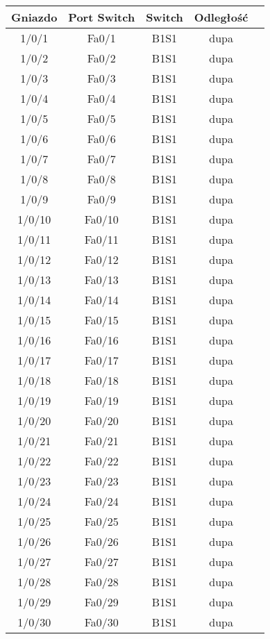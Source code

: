 \begin{center}
    \begin{longtable}{|c|c|c|c|c|}
    \hline
    Gniazdo & Port Switch & Switch & Odległość \\ \hline
	1/0/1 & Fa0/1 & B1S1 & dupa \\ \hline
	1/0/2 & Fa0/2 & B1S1 & dupa \\ \hline
	1/0/3 & Fa0/3 & B1S1 & dupa \\ \hline
	1/0/4 & Fa0/4 & B1S1 & dupa \\ \hline
	1/0/5 & Fa0/5 & B1S1 & dupa \\ \hline
	1/0/6 & Fa0/6 & B1S1 & dupa \\ \hline
	1/0/7 & Fa0/7 & B1S1 & dupa \\ \hline
	1/0/8 & Fa0/8 & B1S1 & dupa \\ \hline
	1/0/9 & Fa0/9 & B1S1 & dupa \\ \hline
	1/0/10 & Fa0/10 & B1S1 & dupa \\ \hline
	1/0/11 & Fa0/11 & B1S1 & dupa \\ \hline
	1/0/12 & Fa0/12 & B1S1 & dupa \\ \hline
	1/0/13 & Fa0/13 & B1S1 & dupa \\ \hline
	1/0/14 & Fa0/14 & B1S1 & dupa \\ \hline
	1/0/15 & Fa0/15 & B1S1 & dupa \\ \hline
	1/0/16 & Fa0/16 & B1S1 & dupa \\ \hline
	1/0/17 & Fa0/17 & B1S1 & dupa \\ \hline
	1/0/18 & Fa0/18 & B1S1 & dupa \\ \hline
	1/0/19 & Fa0/19 & B1S1 & dupa \\ \hline
	1/0/20 & Fa0/20 & B1S1 & dupa \\ \hline
	1/0/21 & Fa0/21 & B1S1 & dupa \\ \hline
	1/0/22 & Fa0/22 & B1S1 & dupa \\ \hline
	1/0/23 & Fa0/23 & B1S1 & dupa \\ \hline
	1/0/24 & Fa0/24 & B1S1 & dupa \\ \hline
	1/0/25 & Fa0/25 & B1S1 & dupa \\ \hline
	1/0/26 & Fa0/26 & B1S1 & dupa \\ \hline
	1/0/27 & Fa0/27 & B1S1 & dupa \\ \hline
	1/0/28 & Fa0/28 & B1S1 & dupa \\ \hline
	1/0/29 & Fa0/29 & B1S1 & dupa \\ \hline
	1/0/30 & Fa0/30 & B1S1 & dupa \\ \hline

\end{longtable}
\end{center}
